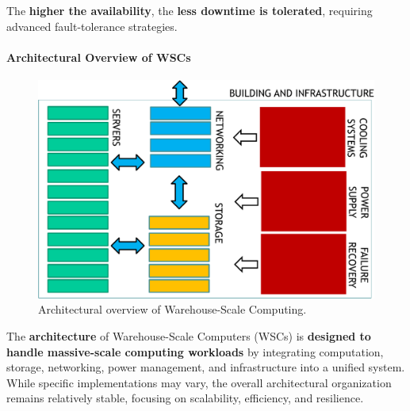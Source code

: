 \noindent
The \textbf{higher the availability}, the \textbf{less downtime is tolerated}, requiring advanced fault-tolerance strategies.

\newpage

\paragraph{Architectural Overview of WSCs}

\begin{figure}[!htp]
    \centering
    \includegraphics[width=\textwidth]{img/WSC-architecture-1.pdf}
    \caption{Architectural overview of Warehouse-Scale Computing.}
\end{figure}

\noindent
The \textbf{architecture} of Warehouse-Scale Computers (WSCs) is \textbf{designed to handle massive-scale computing workloads} by integrating computation, storage, networking, power management, and infrastructure into a unified system. While specific implementations may vary, the overall architectural organization remains relatively stable, focusing on scalability, efficiency, and resilience.

